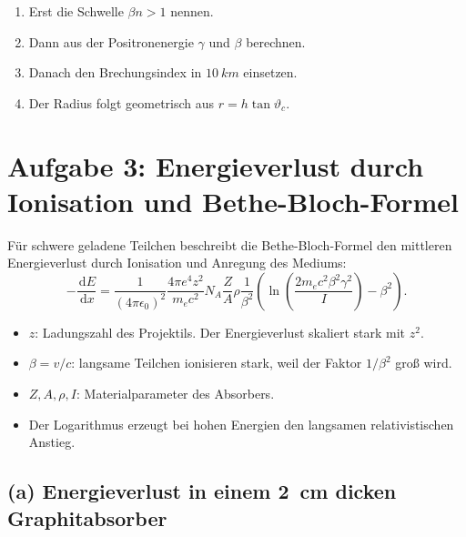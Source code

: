 \documentclass[11pt,a4paper]{scrartcl}
\newcommand{\paren}[1]{\left( #1 \right)}
\newcommand{\dd}{\,\mathrm{d}}
\newcommand{\dv}[2]{\frac{\dd #1}{\dd #2}}
\theoremstyle{definition}
\theoremstyle{plain}
\theoremstyle{remark}
\begin{document}
\begin{summarybox}[title=Tafelvortrag zu Aufgabe 2]
\begin{enumerate}
    \item Erst die Schwelle $\beta n>1$ nennen.
    \item Dann aus der Positronenergie $\gamma$ und $\beta$ berechnen.
    \item Danach den Brechungsindex in $\SI{10}{km}$ einsetzen.
    \item Der Radius folgt geometrisch aus $r=h\tan\vartheta_c$.
\end{enumerate}
\end{summarybox}

\FloatBarrier
\newpage

\section{Aufgabe 3: Energieverlust durch Ionisation und Bethe-Bloch-Formel}

\begin{taskbox}
F\"ur schwere geladene Teilchen beschreibt die Bethe-Bloch-Formel den mittleren Energieverlust durch Ionisation und Anregung des Mediums:
\[
-\dv{E}{x}
=\frac{1}{(4\pi\epsilon_0)^2}\frac{4\pi e^4z^2}{m_ec^2}N_A\frac{Z}{A}\rho\frac{1}{\beta^2}
\paren{
\ln\paren{\frac{2m_ec^2\beta^2\gamma^2}{I}}-\beta^2
}.
\]
\end{taskbox}

\begin{definitionbox}[title=Bedeutung der wichtigsten Faktoren]
\begin{itemize}
    \item $z$: Ladungszahl des Projektils. Der Energieverlust skaliert stark mit $z^2$.
    \item $\beta=v/c$: langsame Teilchen ionisieren stark, weil der Faktor $1/\beta^2$ gro\ss{} wird.
    \item $Z,A,\rho,I$: Materialparameter des Absorbers.
    \item Der Logarithmus erzeugt bei hohen Energien den langsamen relativistischen Anstieg.
\end{itemize}
\end{definitionbox}

\subsection*{(a) Energieverlust in einem \SI{2}{cm} dicken Graphitabsorber}
\end{document}
